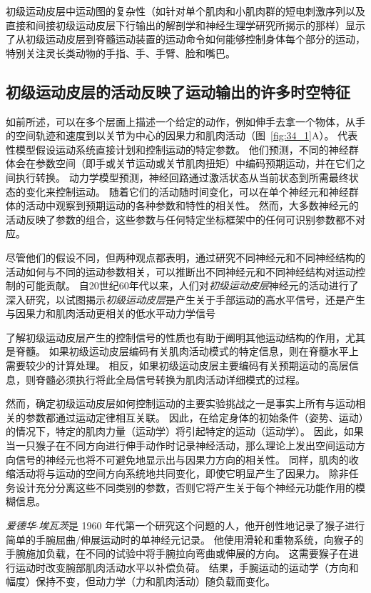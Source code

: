 初级运动皮层中运动图的复杂性（如针对单个肌肉和小肌肉群的短电刺激序列以及直接和间接初级运动皮层下行输出的解剖学和神经生理学研究所揭示的那样）显示了从初级运动皮层到脊髓运动装置的运动命令如何能够控制身体每个部分的运动，特别关注灵长类动物的手指、手、手臂、脸和嘴巴。



\subsection{初级运动皮层的活动反映了运动输出的许多时空特征}

如前所述，可以在多个层面上描述一个给定的动作，例如伸手去拿一个物体，从手的空间轨迹和速度到以关节为中心的因果力和肌肉活动（图~\ref{fig:34_1}A）。
代表性模型假设运动系统直接计划和控制运动的特定参数。
他们预测，不同的神经群体会在参数空间（即手或关节运动或关节肌肉扭矩）中编码预期运动，并在它们之间执行转换。
动力学模型预测，神经回路通过激活状态从当前状态到所需最终状态的变化来控制运动。
随着它们的活动随时间变化，可以在单个神经元和神经群体的活动中观察到预期运动的各种参数和特性的相关性。
然而，大多数神经元的活动反映了参数的组合，这些参数与任何特定坐标框架中的任何可识别参数都不对应。


尽管他们的假设不同，但两种观点都表明，通过研究不同神经元和不同神经结构的活动如何与不同的运动参数相关，可以推断出不同神经元和不同神经结构对运动控制的可能贡献。
自20世纪60年代以来，人们对\textit{初级运动皮层}神经元的活动进行了深入研究，以试图揭示\textit{初级运动皮层}是产生关于手部运动的高水平信号，还是产生与因果力和肌肉活动更相关的低水平动力学信号


了解初级运动皮层产生的控制信号的性质也有助于阐明其他运动结构的作用，尤其是脊髓。
如果初级运动皮层编码有关肌肉活动模式的特定信息，则在脊髓水平上需要较少的计算处理。
相反，如果初级运动皮层主要编码有关预期运动的高层信息，则脊髓必须执行将此全局信号转换为肌肉活动详细模式的过程。


然而，确定初级运动皮层如何控制运动的主要实验挑战之一是事实上所有与运动相关的参数都通过运动定律相互关联。
因此，在给定身体的初始条件（姿势、运动）的情况下，特定的肌肉力量（运动学）将引起特定的运动（运动学）。
因此，如果当一只猴子在不同方向进行伸手动作时记录神经活动，那么理论上发出空间运动方向信号的神经元也将不可避免地显示出与因果力方向的相关性。
同样，肌肉的收缩活动将与运动的空间方向系统地共同变化，即使它明显产生了因果力。
除非任务设计充分分离这些不同类别的参数，否则它将产生关于每个神经元功能作用的模糊信息。


\textit{爱德华$\cdot$埃瓦茨}是 1960 年代第一个研究这个问题的人，他开创性地记录了猴子进行简单的手腕屈曲/伸展运动时的单神经元记录。
他使用滑轮和重物系统，向猴子的手腕施加负载，在不同的试验中将手腕拉向弯曲或伸展的方向。
这需要猴子在进行运动时改变腕部肌肉活动水平以补偿负荷。
结果，手腕运动的运动学（方向和幅度）保持不变，但动力学（力和肌肉活动）随负载而变化。


